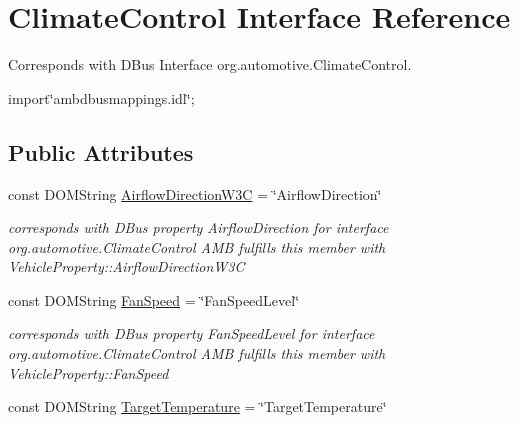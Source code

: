 \hypertarget{interfaceClimateControl}{\section{Climate\+Control Interface Reference}
\label{interfaceClimateControl}
}


Corresponds with D\+Bus Interface org.\+automotive.\+Climate\+Control.  




{\ttfamily import\char`\"{}ambdbusmappings.\+idl\char`\"{};}

\subsection*{Public Attributes}
\begin{DoxyCompactItemize}
\item 
\hypertarget{interfaceClimateControl_a745680c0e53b1f1946a433995d1b8322}{const D\+O\+M\+String \hyperlink{interfaceClimateControl_a745680c0e53b1f1946a433995d1b8322}{Airflow\+Direction\+W3\+C} = \char`\"{}Airflow\+Direction\char`\"{}}\label{interfaceClimateControl_a745680c0e53b1f1946a433995d1b8322}

\begin{DoxyCompactList}\small\item\em corresponds with D\+Bus property Airflow\+Direction for interface org.\+automotive.\+Climate\+Control A\+M\+B fulfills this member with Vehicle\+Property\+::\+Airflow\+Direction\+W3\+C \end{DoxyCompactList}\item 
\hypertarget{interfaceClimateControl_a6973d35cb3f14659a1f26e8adb58979f}{const D\+O\+M\+String \hyperlink{interfaceClimateControl_a6973d35cb3f14659a1f26e8adb58979f}{Fan\+Speed} = \char`\"{}Fan\+Speed\+Level\char`\"{}}\label{interfaceClimateControl_a6973d35cb3f14659a1f26e8adb58979f}

\begin{DoxyCompactList}\small\item\em corresponds with D\+Bus property Fan\+Speed\+Level for interface org.\+automotive.\+Climate\+Control A\+M\+B fulfills this member with Vehicle\+Property\+::\+Fan\+Speed \end{DoxyCompactList}\item 
\hypertarget{interfaceClimateControl_ad3c6b2948978b0449add3fb7d25d930f}{const D\+O\+M\+String \hyperlink{interfaceClimateControl_ad3c6b2948978b0449add3fb7d25d930f}{Target\+Temperature} = \char`\"{}Target\+Temperature\char`\"{}}\label{interfaceClimateControl_ad3c6b2948978b0449add3fb7d25d930f}


\end{DoxyCompactItemize}
